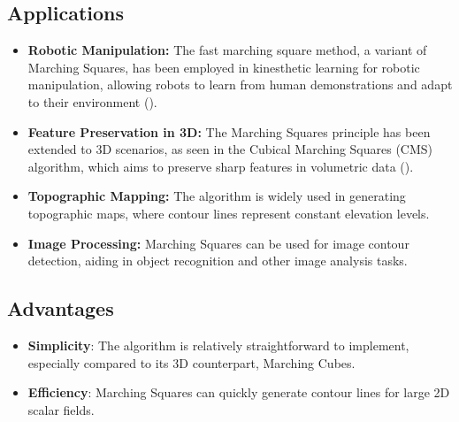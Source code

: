 \subsection{Applications}

\begin{itemize}
\item \textbf{Robotic Manipulation:}
The fast marching square method, a variant of Marching Squares, has been employed in kinesthetic learning for robotic manipulation, allowing robots to learn from human demonstrations and adapt to their environment (\cite{Prados_2023}).

\item \textbf{Feature Preservation in 3D:}
The Marching Squares principle has been extended to 3D scenarios, as seen in the Cubical Marching Squares (CMS) algorithm, which aims to preserve sharp features in volumetric data (\cite{Chien-Chang_2005}).

\item \textbf{Topographic Mapping:} The algorithm is widely used in generating topographic maps, where contour lines represent constant elevation levels.

\item \textbf{Image Processing:}
Marching Squares can be used for image contour detection, aiding in object recognition and other image analysis tasks.
\end{itemize}

\subsection{Advantages}
\begin{itemize}
\item \textbf{Simplicity}: The algorithm is relatively straightforward to implement, especially compared to its 3D counterpart, Marching Cubes.
\item \textbf{Efficiency}: Marching Squares can quickly generate contour lines for large 2D scalar fields.
\end{itemize}


